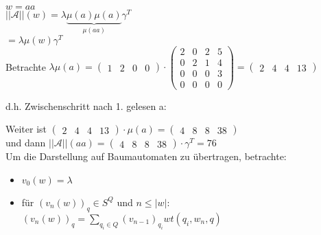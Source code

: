 \documentclass[titlepage]{article}
\begin{document}
$w = aa$\\
$||\mathcal{A}||(w) = \lambda \underbrace{\mu (a) \mu (a)}_{\mu (aa)} \gamma^T$\\
$=\lambda \mu (w) \gamma^T$\\

Betrachte $\lambda \mu (a) = \begin{pmatrix}1 & 2 & 0 & 0\end{pmatrix} \cdot 
\begin{pmatrix}
    2 & 0 & 2 & 5 \\
    0 & 2 & 1 & 4 \\
    0 & 0 & 0 & 3 \\
    0 & 0 & 0 & 0
\end{pmatrix}
= \begin{pmatrix}2 & 4 & 4 & 13\end{pmatrix}$

d.h. Zwischenschritt nach 1. gelesen a:


Weiter ist $\begin{pmatrix}2 & 4 & 4 & 13\end{pmatrix} \cdot \mu (a) = \begin{pmatrix}4 & 8 & 8 & 38\end{pmatrix}$\\
und dann $||\mathcal{A}||(aa) = \begin{pmatrix}4 & 8 & 8 & 38\end{pmatrix} \cdot \gamma^T = 76$\\

Um die Darstellung auf Baumautomaten zu \"ubertragen, betrachte:\\
\begin{itemize}
    \item $v_0 (w) = \lambda$
    \item f\"ur $(v_n(w))_q \in S^Q $ und $n \leq |w|$: $(v_n(w))_q = \sum\limits_{q_i \in Q} (v_{n-1})_{q_i} wt(q_i,w_n,q)$
\end{itemize}
\end{document}
